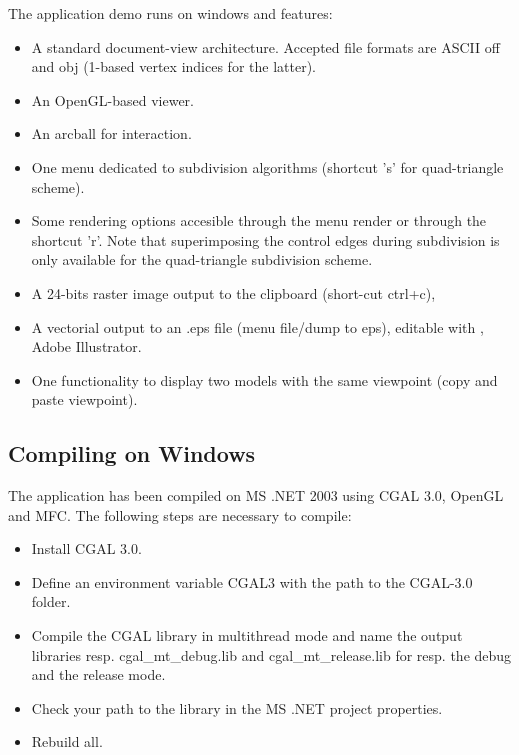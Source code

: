 \documentclass[letter,twoside,10pt]{article}
\begin{document}
The application demo runs on windows and features:
\begin{itemize}

\item 
A standard document-view architecture. Accepted file formats are ASCII
off and obj (1-based vertex indices for the latter).

\item 
An OpenGL-based viewer.

\item 
An arcball for interaction.

\item 
One menu dedicated to subdivision algorithms (shortcut 's' for
quad-triangle scheme).

\item 
Some rendering options accesible through the menu render or through
the shortcut 'r'. Note that superimposing the control edges during
subdivision is only available for the quad-triangle subdivision
scheme.

\item 
A 24-bits raster image output to the clipboard (short-cut ctrl+c),

\item 
A vectorial output to an .eps file (menu file/dump to eps), editable
with , Adobe Illustrator.

\item 
One functionality to display two models with the same viewpoint (copy
and paste viewpoint).

\end{itemize}

\subsection{Compiling on Windows}

The application has been compiled on MS .NET 2003 using CGAL 3.0,
OpenGL and MFC. The following steps are necessary to compile:
\begin{itemize}
\item Install CGAL 3.0.
\item Define an environment variable CGAL3 with the path to the CGAL-3.0 folder.
\item Compile the CGAL library in multithread mode and name the output 
      libraries resp. cgal\_mt\_debug.lib and cgal\_mt\_release.lib 
      for resp. the debug and the release mode.
\item Check your path to the library in the MS .NET project
      properties.
\item Rebuild all.
\end{itemize}



\end{document}
